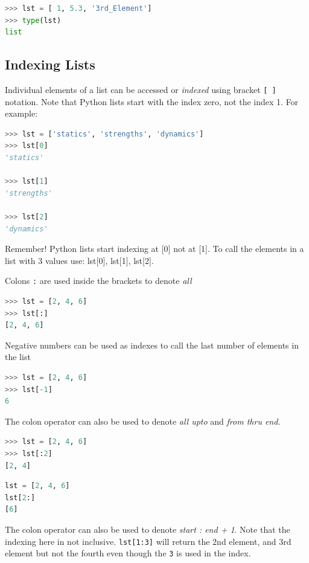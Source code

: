 \documentclass{book}
\begin{document}
\begin{lstlisting}[language=Python]
>>> lst = [ 1, 5.3, '3rd_Element']
>>> type(lst)
list
\end{lstlisting}
    




    
        \subsection{Indexing Lists}\label{indexing-lists}

Individual elements of a list can be accessed or \emph{indexed} using
bracket \lstinline![ ]! notation. Note that Python lists start with the
index zero, not the index 1. For example:

\begin{lstlisting}[language=Python]
>>> lst = ['statics', 'strengths', 'dynamics']
>>> lst[0]
'statics'

>>> lst[1]
'strengths'

>>> lst[2]
'dynamics'
\end{lstlisting}

Remember! Python lists start indexing at {[}0{]} not at {[}1{]}. To call
the elements in a list with 3 values use: lst{[}0{]}, lst{[}1{]},
lst{[}2{]}.

Colons \lstinline!:! are used inside the brackets to denote \emph{all}

\begin{lstlisting}[language=Python]
>>> lst = [2, 4, 6]
>>> lst[:]
[2, 4, 6]
\end{lstlisting}

Negative numbers can be used as indexes to call the last number of
elements in the list

\begin{lstlisting}[language=Python]
>>> lst = [2, 4, 6]
>>> lst[-1]
6
\end{lstlisting}

The colon operator can also be used to denote \emph{all upto} and
\emph{from thru end}.

\begin{lstlisting}[language=Python]
>>> lst = [2, 4, 6]
>>> lst[:2]
[2, 4]
\end{lstlisting}

\begin{lstlisting}[language=Python]
lst = [2, 4, 6]
lst[2:]
[6]
\end{lstlisting}

The colon operator can also be used to denote \emph{start : end + 1}.
Note that the indexing here in not inclusive. \lstinline!lst[1:3]! will
return the 2nd element, and 3rd element but not the fourth even though
the \lstinline!3! is used in the index.
\end{document}
